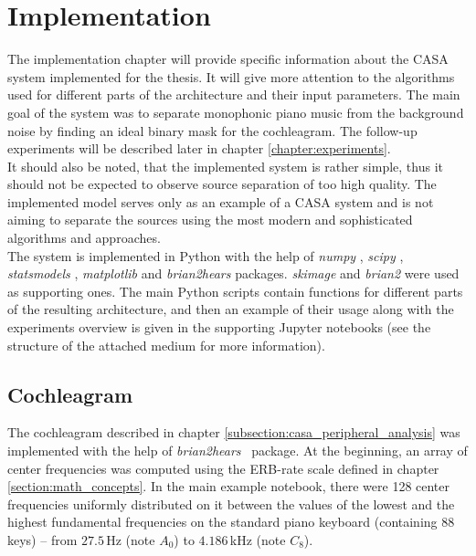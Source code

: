 \chapter{Implementation}\label{chapter:implementation}

The implementation chapter will provide specific information about the CASA system implemented for the thesis. It will give more attention to the algorithms used for different parts of the architecture and their input parameters. The main goal of the system was to separate monophonic piano music from the background noise by finding an ideal binary mask for the cochleagram. The follow-up experiments will be described later in chapter \ref{chapter:experiments}.\\

It should also be noted, that the implemented system is rather simple, thus it should not be expected to observe source separation of too high quality. The implemented model serves only as an example of a CASA system and is not aiming to separate the sources using the most modern and sophisticated algorithms and approaches.\\

The system is implemented in Python with the help of \textit{numpy} \cite{Harris2020}, \textit{scipy} \cite{Virtanen2020}, \textit{statsmodels} \cite{Seabold2010}, \textit{matplotlib} \cite{Hunter2007} and \textit{brian2hears} \cite{Stimberg2019brian2hears} packages. \textit{skimage} \cite{VanDerWalt2014} and \textit{brian2} \cite{Stimberg2019brian2} were used as supporting ones. The main Python scripts contain functions for different parts of the resulting architecture, and then an example of their usage along with the experiments overview is given in the supporting Jupyter notebooks (see the structure of the attached medium for more information).

\section{Cochleagram}

The cochleagram described in chapter \ref{subsection:casa_peripheral_analysis} was implemented with the help of \textit{brian2hears}~\cite{Stimberg2019brian2hears} package. At the beginning, an array of center frequencies was computed using the ERB-rate scale defined in chapter \ref{section:math_concepts}. In the main example notebook, there were 128 center frequencies uniformly distributed on it between the values of the lowest and the highest fundamental frequencies on the standard piano keyboard (containing 88 keys) -- from $27.5$\,Hz (note $A_0$) to $4.186$\,kHz (note $C_8$).\\

